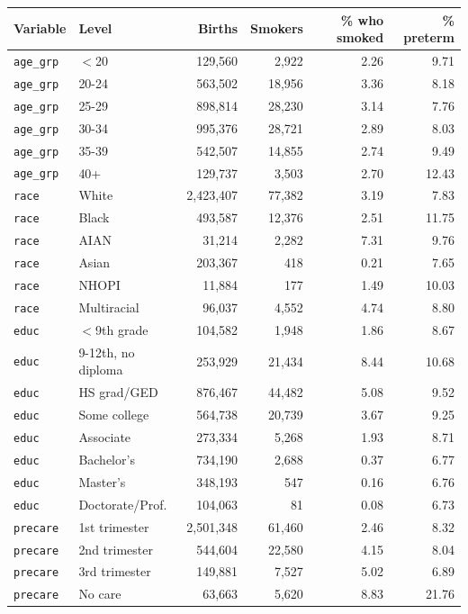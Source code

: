 {\small
\begin{longtable}{llrrrr}
\toprule
Variable & Level & Births & Smokers & \% who smoked & \% preterm \\
\midrule
\endhead
\texttt{age\_grp} & $<$20 & 129,560 & 2,922 & 2.26 & 9.71 \\
\texttt{age\_grp} & 20-24 & 563,502 & 18,956 & 3.36 & 8.18 \\
\texttt{age\_grp} & 25-29 & 898,814 & 28,230 & 3.14 & 7.76 \\
\texttt{age\_grp} & 30-34 & 995,376 & 28,721 & 2.89 & 8.03 \\
\texttt{age\_grp} & 35-39 & 542,507 & 14,855 & 2.74 & 9.49 \\
\texttt{age\_grp} & 40+ & 129,737 & 3,503 & 2.70 & 12.43 \\
\texttt{race} & White & 2,423,407 & 77,382 & 3.19 & 7.83 \\
\texttt{race} & Black & 493,587 & 12,376 & 2.51 & 11.75 \\
\texttt{race} & AIAN & 31,214 & 2,282 & 7.31 & 9.76 \\
\texttt{race} & Asian & 203,367 & 418 & 0.21 & 7.65 \\
\texttt{race} & NHOPI & 11,884 & 177 & 1.49 & 10.03 \\
\texttt{race} & Multiracial & 96,037 & 4,552 & 4.74 & 8.80 \\
\texttt{educ} & $<$9th grade & 104,582 & 1,948 & 1.86 & 8.67 \\
\texttt{educ} & 9-12th, no diploma & 253,929 & 21,434 & 8.44 & 10.68 \\
\texttt{educ} & HS grad/GED & 876,467 & 44,482 & 5.08 & 9.52 \\
\texttt{educ} & Some college & 564,738 & 20,739 & 3.67 & 9.25 \\
\texttt{educ} & Associate & 273,334 & 5,268 & 1.93 & 8.71 \\
\texttt{educ} & Bachelor's & 734,190 & 2,688 & 0.37 & 6.77 \\
\texttt{educ} & Master's & 348,193 & 547 & 0.16 & 6.76 \\
\texttt{educ} & Doctorate/Prof. & 104,063 & 81 & 0.08 & 6.73 \\
\texttt{precare} & 1st trimester & 2,501,348 & 61,460 & 2.46 & 8.32 \\
\texttt{precare} & 2nd trimester & 544,604 & 22,580 & 4.15 & 8.04 \\
\texttt{precare} & 3rd trimester & 149,881 & 7,527 & 5.02 & 6.89 \\
\texttt{precare} & No care & 63,663 & 5,620 & 8.83 & 21.76 \\

\end{longtable}}
